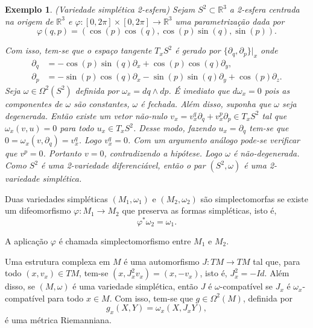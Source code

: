 \documentclass[12pt]{book}
\newtheorem{exemplo}[teorema]{Exemplo}
\newcommand{\derivadaparcialabrev}[1]{\partial_{#1}}
\newcommand{\real}[1]{\mathbb{R}^{#1}}
\begin{document}
	\begin{exemplo}\label{exemplo_variedade_simpletica_esfera}
		(Variedade simplética 2-esfera) Sejam $S^{2} \subset \real{3}$ a 2-esfera centrada na origem de $\real{3}$ e $\varphi:[0,2\pi]\times [0,2\pi] \to \real{3}$ uma parametrização dada por 
		$$
		\varphi(q, p) = (\cos (p) \cos (q), \cos (p) \sin (q), \sin (p)).
		$$
		
		Com isso, tem-se que o espaço tangente $T_{x}S^{2} $ é gerado por $ \{\derivadaparcialabrev{ q}, \derivadaparcialabrev{ p} \}|_{x}$ onde
		$$
		\begin{aligned}
		\derivadaparcialabrev{ q} &= -\cos (p)\sin (q) \derivadaparcialabrev{x}+ \cos (p)\cos (q) \derivadaparcialabrev{y},
		\\
		\derivadaparcialabrev{ p} &=  - \sin (p) \cos (q) 	\derivadaparcialabrev{x} - \sin (p) \sin (q) 	\derivadaparcialabrev{y} +\cos (p)				\derivadaparcialabrev{z}.
		\end{aligned} 
		$$
		Seja $\omega\in \Omega^{2}(S^{2})$ definida por $\omega_{x} = dq \wedge dp$. É imediato que $d\omega_{x} = 0$ pois as componentes de $\omega$ são constantes, $\omega$ é fechada. Além disso, suponha que $\omega$ seja degenerada. Então existe um vetor não-nulo $v_{x} = v^{q}_{x}\partial_{q}+v^{p}_{x}\partial_{p} \in T_{x}S^{2}$ tal que $\omega_{x}(v, u)=0$ para todo $u_{x}\in T_{x}S^{2}$. Desse modo, fazendo $u_{x} = \partial_{q}$ tem-se que $0=\omega_{x}(v, \partial_{q}) = v^{q}_{x}$. Logo $v^{q}_{x}=0$. Com um argumento análogo pode-se verificar que $v^{p}=0$. Portanto $v=0$, contradizendo a hipótese. Logo $\omega$ é não-degenerada. Como $S^{2}$ é uma 2-variedade diferenciável, então o par $(S^{2}, \omega)$ é uma 2-variedade simplética.
	\end{exemplo}
	
	Duas variedades simpléticas $(M_{1}, \omega_{1})$ e $(M_{2}, \omega_{2})$ são simplectomorfas se existe um difeomorfismo $\varphi: M_{1}\to M_{2}$ que preserva as formas simpléticas, isto é,
	$$
	\varphi^{*}\omega_{2}=\omega_{1}.
	$$
	
	A aplicação $\varphi$ é chamada simplectomorfismo entre $M_{1}$ e $M_{2}$.
	
	Uma estrutura complexa em $M$ é uma automorfismo $J:TM \to TM$ tal que, para todo $(x,v_{x})\in TM$, tem-se $(x, J^{2}_{x}v_{x}) = (x, -v_{x})$, isto é, $J^{2}_{x}=-Id$. Além disso, se $(M, \omega)$ é uma variedade simplética, então $J$ é $\omega$-compatível se $J_{x}$ é $\omega_{x}$-compatível para todo $x\in M$. Com isso, tem-se que $g \in \Omega^{2}(M)$, definida por
	$$
	g_{x}(X, Y) =\omega_{x}(X, J_{x}Y),
	$$
	é uma métrica Riemanniana.
\end{document}
